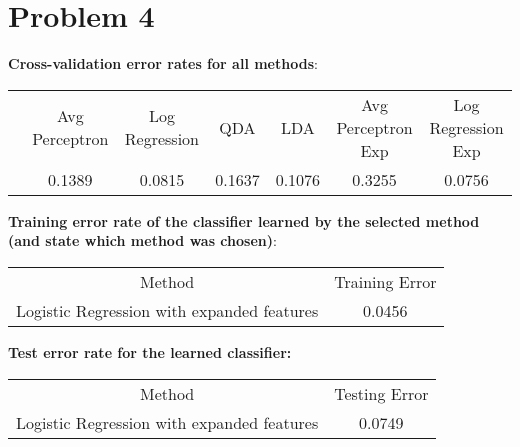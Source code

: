 \documentclass[twoside,11pt]{homework}
\begin{document}
\section*{Problem 4}
\textbf{Cross-validation error rates for all methods}:
\begin{center}
  \begin{tabular}{c  c  c  c  c  c  c }
    & Avg Perceptron
    & Log Regression
    & QDA
    & LDA
    & Avg Perceptron Exp
    & Log Regression Exp
    \\
    & 0.1389
    & 0.0815
    & 0.1637
    & 0.1076
    & 0.3255
    & 0.0756
  \end{tabular}
\end{center}

\textbf{Training error rate of the classifier learned by the selected method (and state which method was chosen)}:
\begin{center}
\begin{tabular}{  c  c } 
Method & Training Error \\
Logistic Regression with expanded features & 0.0456 \\ 
\end{tabular}
\end{center}

\textbf{Test error rate for the learned classifier:}
\begin{center}
\begin{tabular}{  c  c } 
Method & Testing Error \\
Logistic Regression with expanded features & 0.0749 \\ 
\end{tabular}
\end{center}
\end{document}
